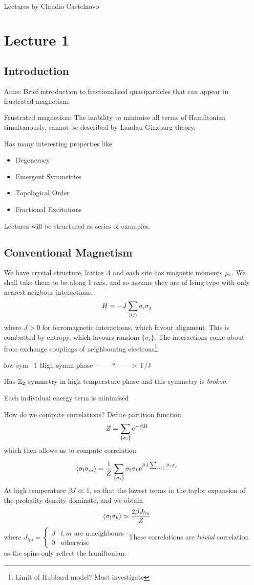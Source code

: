 \documentclass[a4paper]{article}
\author{Oscar Emil Sommer}
\begin{document}
Lectures by Claudio Castelnovo
\section{Lecture 1}
\subsection{Introduction}
Aims: Brief introduction to fractionalised quasiparticles that can appear in frustrated
magnetism.

Frustrated magnetism: The inability to minimise all terms of Hamiltonian
simultanously, cannot be described by Landau-Ginzburg theory.

Has many interesting properties like
\begin{itemize}
    \item Degeneracy
    \item Emergent Symmetries
    \item Topological Order
    \item Fractional Excitations
\end{itemize}
Lectures will be structured as series of examples.

\subsection{Conventional Magnetism}
We have crystal structure, lattice $\Lambda$ and each site has magnetic moments
$\mathbf{\mu}_i$. We shall take them to be along 1 axis, and so assume they are of
Ising type with only nearest neigbour interactions.
\[
    H=-J\sum_{\braket{ij}} \sigma_i\sigma_j
\]
where $J>0$ for ferromagnetic interactions, which favour alignment. This is
combatted by entropy, which favours random $\{\sigma_i\}$.
The interactions come about from exchange couplings of neighbouring
electrons\footnote{Limit of Hubbard model? Must investigate}

low sym ~1 High symm phase
--------*-------> T/J

Has $\mathbb{Z}_2$ symmetry in high temperature phase and this symmetry is
\emph{broken}.
\begin{remark}
    Each individual energy term is minimised
\end{remark}

\begin{example}
How do we compute correlations? Define partition function
\[ 
    Z=\sum_{\{\sigma_i\}} \mathrm{e}^{-\beta H}
\]
which then allows us to compute correlation

\[
    \braket{\sigma_l\sigma_m}=\frac{1}{Z}\sum_{\{\sigma_i\}}\sigma_l\sigma_k\mathrm{e}^{\beta
    J\sum_{\braket{ij}} \sigma_i\sigma_j}
\]
At high temperature  $\beta J\ll 1$, so that the lowest terms in the taylor
expansion of the probality density dominate, and we obtain 
\[
    \braket{\sigma_l\sigma_k}\simeq\frac{2\beta J_{lm}}{Z}
\]
where $J_{lm}=\begin{cases}J &\text{$l,m$ are n.neighbours}\\
0&\text{otherwise}\end{cases}$ 
These correlations are \emph{trivial} correlation as the spins only reflect the
hamiltonian.
\end{example}
\end{document}
